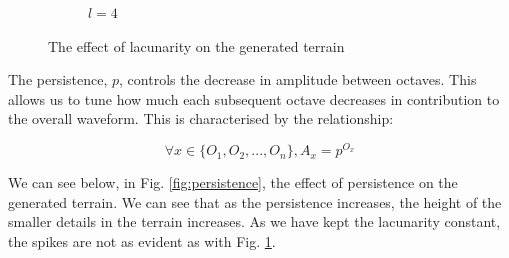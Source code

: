\documentclass[12pt]{article}
\begin{document}
\begin{figure}[H]
\begin{subfigure}{0.3\textwidth}
        \caption{$l=4$}
        \label{fig:lacunarity4}
    \end{subfigure}
    \caption{The effect of lacunarity on the generated terrain}
    \label{fig:lacunarity}
\end{figure}


The persistence, $p$, controls the decrease in amplitude between octaves. This allows us to tune how much each subsequent octave decreases in contribution to the overall waveform. This is characterised by the relationship:

$$\forall x \in \{O_1,O_2,...,O_n\}, A_x = p^{O_x}$$

We can see below, in Fig. \ref{fig:persistence}, the effect of persistence on the generated terrain. We can see that as the persistence increases, the height of the smaller details in the terrain increases. As we have kept the lacunarity constant, the spikes are not as evident as with Fig. \ref{fig:lacunarity4}.
\end{document}
